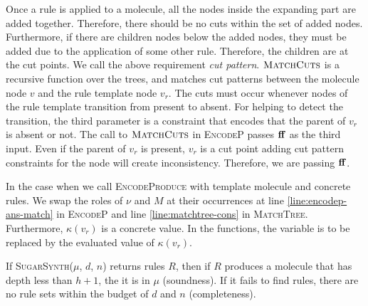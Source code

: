 Once a rule is applied to a molecule, all the
nodes inside the expanding part are added together.
Therefore, there should be no cuts within the set of added nodes.
Furthermore, if there are children nodes below the added nodes,
they must be added due to the application of some other rule.
Therefore, the children are at the cut points.
We call the above requirement {\em cut pattern}. 
$\textsc{MatchCuts}$ is a recursive function over the trees, and matches
cut patterns between the molecule node $v$ and the rule template node $v_r$.
The cuts must occur whenever nodes of the rule template transition
from present to absent.
For helping to detect the transition,
the third parameter is a constraint that encodes that the parent of $v_r$
is absent or not.
The call to $\textsc{MatchCuts}$ in \textsc{EncodeP} passes $\mathbf{ff}$ as the third input.
Even if the parent of $v_r$ is present,
$v_r$ is a cut point adding cut pattern constraints for the node will create inconsistency.
Therefore, we are passing $\mathbf{ff}$.

In the case when we call \textsc{EncodeProduce} with template molecule and
concrete rules.
We swap the roles of $\nu$ and $M$ at their occurrences
at line \ref{line:encodep-ans-match} in \textsc{EncodeP} and
line \ref{line:matchtree-cons} in \textsc{MatchTree}.
Furthermore, $\kappa(v_r)$ is a concrete value.
In the functions, the variable is to be replaced by the
evaluated value of $\kappa(v_r)$.

\begin{theorem}
  If \textsc{SugarSynth}($\mu$, $d$, $n$) returns  rules $R$, then if $R$ produces a molecule that has depth less than $h+1$, the it is in $\mu$ (soundness).
  If it fails to find rules, there are no rule sets within the budget of $d$ and  $n$ (completeness).
\end{theorem}

